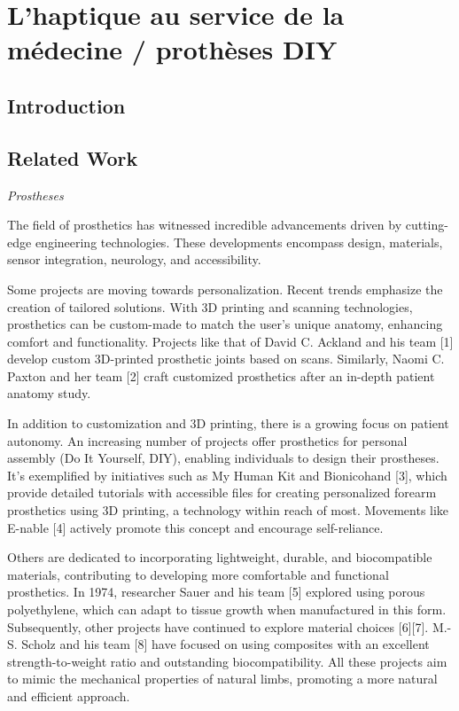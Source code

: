 \chapter{L’haptique au service de la médecine / prothèses DIY }
\section{Introduction}

\section{Related Work}

\textit{Prostheses}

The field of prosthetics has witnessed incredible advancements driven by cutting-edge engineering technologies. These developments encompass design, materials, sensor integration, neurology, and accessibility.

Some projects are moving towards personalization. Recent trends emphasize the creation of tailored solutions. With 3D printing and scanning technologies, prosthetics can be custom-made to match the user's unique anatomy, enhancing comfort and functionality. Projects like that of David C. Ackland and his team [1] develop custom 3D-printed prosthetic joints based on scans. Similarly, Naomi C. Paxton and her team [2] craft customized prosthetics after an in-depth patient anatomy study.

In addition to customization and 3D printing, there is a growing focus on patient autonomy. An increasing number of projects offer prosthetics for personal assembly (Do It Yourself, DIY), enabling individuals to design their prostheses. It's exemplified by initiatives such as My Human Kit and Bionicohand [3], which provide detailed tutorials with accessible files for creating personalized forearm prosthetics using 3D printing, a technology within reach of most. Movements like E-nable [4] actively promote this concept and encourage self-reliance.

Others are dedicated to incorporating lightweight, durable, and biocompatible materials, contributing to developing more comfortable and functional prosthetics. In 1974, researcher Sauer and his team [5] explored using porous polyethylene, which can adapt to tissue growth when manufactured in this form. Subsequently, other projects have continued to explore material choices [6][7]. M.-S. Scholz and his team [8] have focused on using composites with an excellent strength-to-weight ratio and outstanding biocompatibility. All these projects aim to mimic the mechanical properties of natural limbs, promoting a more natural and efficient approach.

